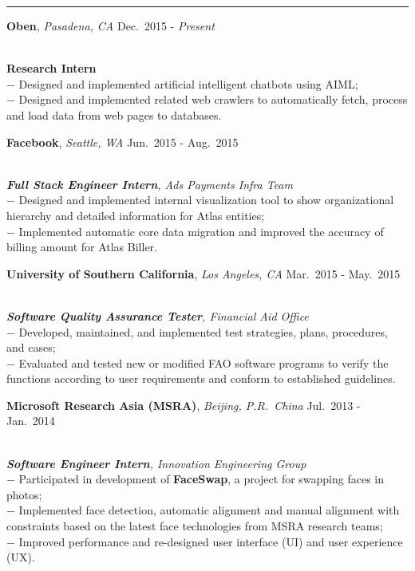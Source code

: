 \documentclass[a4paper,10pt]{article}
\newcommand{\shadedsection}[1]{
    \setlength{\fboxsep}{0pt}
    \colorbox{shadecolor}{%
        \begin{minipage}{\linewidth}%
            \vspace{0.2em}%
            #1%
        \end{minipage}%
    }
}
\newenvironment{rSection}[1]{ %
  \medskip
  \hspace{-1.5em}{\color{Blue}\MakeUppercase{\large \bf {#1}}} %
  \vspace{-0.2em}
  \medskip
  \hrule %
  \begin{list}{}{ %
    \setlength{\leftmargin}{1.5em} %
  }
\setlength{\itemsep}{1pt}
  \item[]
}{
  \end{list}
}
\newcommand{\detail}[1]{{$-$ {#1}}}
\newcommand{\period}[3]{\normalsize {#1} \hfill {#2} - {#3}}
\begin{document}
\begin{rSection}{Work Experience}
  \vspace{-1.5em}
  \item
    \shadedsection{\period{{\bf Oben}, {\em Pasadena, CA}}{Dec.~2015}{\em Present}}\\
    {\bf Research Intern}\\
    \detail{Designed and implemented artificial intelligent chatbots using AIML;}\\
    \detail{Designed and implemented related web crawlers to automatically fetch, process and load data from web pages to databases.}
  \item
    \shadedsection{\period{{\bf Facebook}, {\em Seattle, WA}}{Jun.~2015}{Aug.~2015}}\\
    {\em {\bf Full Stack Engineer Intern}, Ads Payments Infra Team}\\
    \detail{Designed and implemented internal visualization tool to show organizational hierarchy and detailed information for Atlas entities;}\\
    \detail{Implemented automatic core data migration and improved the accuracy of billing amount for Atlas Biller.}
  \item
    \shadedsection{\period{{\bf University of Southern California}, {\em Los Angeles, CA}}{Mar.~2015}{May.~2015}}\\
    {\em {\bf Software Quality Assurance Tester}, Financial Aid Office}\\
    \detail{Developed, maintained, and implemented test strategies, plans, procedures, and cases;}\\
    \detail{Evaluated and tested new or modified FAO software programs to verify the functions according to user requirements and conform to established guidelines.}
  \item
    \shadedsection{\period{{\bf Microsoft Research Asia (MSRA)}, {\em Beijing, P.R.~China}}{Jul.~2013}{Jan.~2014}}\\
    {\em {\bf Software Engineer Intern}, Innovation Engineering Group}\\
    \detail{Participated in development of {\bf FaceSwap}, a project for swapping faces in photos;}\\
    \detail{Implemented face detection, automatic alignment and manual alignment with constraints based on the latest face technologies from MSRA research teams;}\\
    \detail{Improved performance and re-designed user interface (UI) and user experience (UX).}
\end{rSection}
\end{document}
